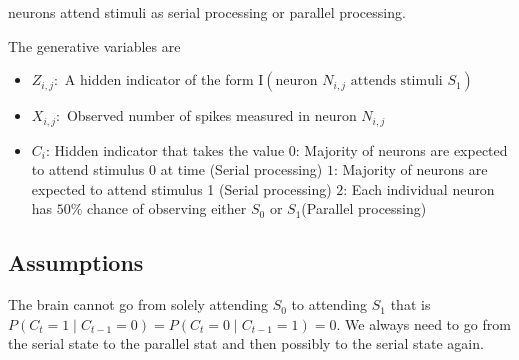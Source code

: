 neurons attend stimuli as serial processing or parallel processing.

The generative variables are

\begin{itemize}
    \item $Z_{i,j}:$ A hidden indicator of the form $ \mathrm I (\text{neuron } N_{i,j} \text{ attends stimuli } S_1)$
    \item $X_{i,j}:$ Observed number of spikes measured in neuron $N_{i,j}$
    \item $C_i$: Hidden indicator that takes the value 
        \subitem $0$: Majority of neurons are expected to attend stimulus 0  at time (Serial processing)
        \subitem $1$: Majority of neurons are expected to attend stimulus 1 (Serial processing)
        \subitem $2$: Each individual neuron has $50\%$ chance of observing either $S_0$ or $S_1$(Parallel processing)
\end{itemize}

\subsection{Assumptions}
The brain cannot go from solely attending $S_0$ to attending $S_1$ that is $P(C_t =1 \mid C_{t-1} = 0) = P(C_t = 0 \mid C_{t-1} = 1) = 0$. We always need to go from the serial state to the parallel stat and then possibly to the serial state again.



